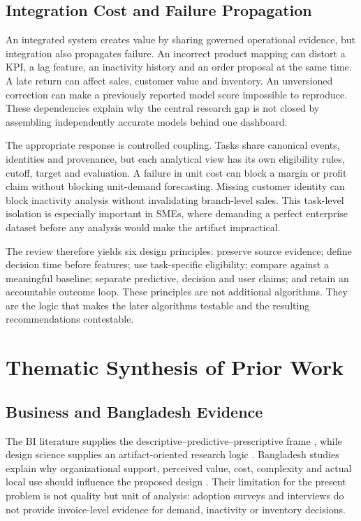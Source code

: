 \subsection{Integration Cost and Failure Propagation}

An integrated system creates value by sharing governed operational evidence,
but integration also propagates failure. An incorrect product mapping can
distort a KPI, a lag feature, an inactivity history and an order proposal at the
same time. A late return can affect sales, customer value and inventory. An
unversioned correction can make a previously reported model score impossible to
reproduce. These dependencies explain why the central research gap is not
closed by assembling independently accurate models behind one dashboard.

The appropriate response is controlled coupling. Tasks share canonical events,
identities and provenance, but each analytical view has its own eligibility
rules, cutoff, target and evaluation. A failure in unit cost can block a margin
or profit claim without blocking unit-demand forecasting. Missing customer
identity can block inactivity analysis without invalidating branch-level sales.
This task-level isolation is especially important in SMEs, where demanding a
perfect enterprise dataset before any analysis would make the artifact
impractical.

The review therefore yields six design principles: preserve source evidence;
define decision time before features; use task-specific eligibility; compare
against a meaningful baseline; separate predictive, decision and user claims;
and retain an accountable outcome loop. These principles are not additional
algorithms. They are the logic that makes the later algorithms testable and the
resulting recommendations contestable.

\section{Thematic Synthesis of Prior Work}

\subsection{Business and Bangladesh Evidence}

The BI literature supplies the descriptive--predictive--prescriptive frame
\cite{chen2012business}, while design science supplies an artifact-oriented
research logic \cite{hevner2004design}. Bangladesh studies explain why
organizational support, perceived value, cost, complexity and actual local use
should influence the proposed design \cite{hoque2016ict,shahadat2023digital,
hazra2021mfs}. Their limitation for the present problem is not quality but unit
of analysis: adoption surveys and interviews do not provide invoice-level
evidence for demand, inactivity or inventory decisions.

